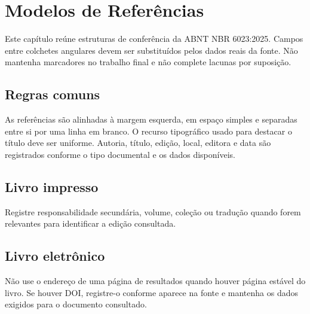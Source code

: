 \chapter{Modelos de Referências}
\label{chap:modelos-referencias}

Este capítulo reúne estruturas de conferência da ABNT NBR 6023:2025. Campos entre colchetes angulares devem ser substituídos pelos dados reais da fonte. Não mantenha marcadores no trabalho final e não complete lacunas por suposição.


\section{Regras comuns}

As referências são alinhadas à margem esquerda, em espaço simples e separadas entre si por uma linha em branco. O recurso tipográfico usado para destacar o título deve ser uniforme. Autoria, título, edição, local, editora e data são registrados conforme o tipo documental e os dados disponíveis.

\section{Livro impresso}


Registre responsabilidade secundária, volume, coleção ou tradução quando forem relevantes para identificar a edição consultada.

\section{Livro eletrônico}


Não use o endereço de uma página de resultados quando houver página estável do livro. Se houver DOI, registre-o conforme aparece na fonte e mantenha os dados exigidos para o documento consultado.


